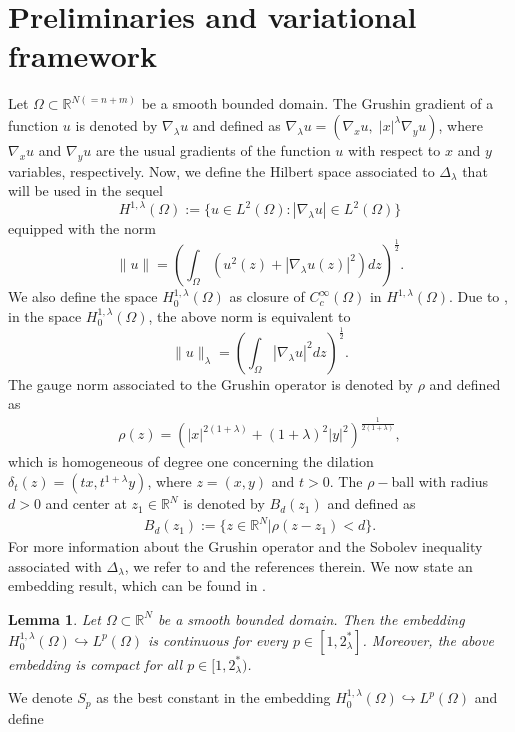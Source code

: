 \documentclass[12pt, notitlepage]{article}
\def\R{\mathbb{R}}
\newtheorem{lem}[theorem]{Lemma}
\begin{document}
{\section{Preliminaries and variational framework}\label{Pri}
Let $\Omega\subset\R^{N(=n+m)}$ be a smooth bounded domain. The Grushin gradient of a function $u$ is denoted by $\nabla_\lambda u$ and defined as $\nabla_\lambda u=(\nabla_x u,\;|x|^\lambda \nabla_y u)$, where $\nabla_x u$ and $\nabla_y u$ are the usual gradients of the function $u$ with respect to $x$ and $y$ variables, respectively. Now, we define the Hilbert space associated to $\Delta_\lambda$ that will be used in the sequel  $$H^{1,\lambda}(\Omega):=\{ u\in L^2(\Omega): |\nabla_\lambda u|\in L^2(\Omega)\}$$
equipped with the norm
$$\|u\|=\left (\int_\Omega \left (u^2(z)+ |\nabla_\lambda u(z)|^2\right ) dz\right )^\frac{1}{2}.$$
 We also define the space $H^{1,\lambda}_0(\Omega)$ as closure of $C_c^\infty(\Omega)$ in $H^{1,\lambda}(\Omega)$. Due to \cite[Theorem 2.1]{MP09}, in the space $H^{1,\lambda}_0(\Omega)$, the above norm is equivalent to $$\|u\|_\lambda=\left (\int_\Omega |\nabla_\lambda u|^2 dz \right )^\frac{1}{2}.$$ 
 The gauge norm associated to the Grushin operator is denoted by $\rho$ and defined as 
 \begin{align}\label{gauge}
     \rho(z)=\left ( |x|^{2(1+\lambda)}+(1+\lambda)^2|y|^2\right )^\frac{1}{2(1+\lambda)},
 \end{align}
 which is homogeneous of degree one concerning the dilation $\delta_t(z)=(tx, t^{1+\lambda}y)$, where $z=(x,y)$ and $t>0$. The $\rho-$ball with radius $d>0$ and center at $z_1\in\R^N$ is denoted by $B_d(z_1)$ and defined as 
 \begin{align}\label{gaugeb}
     B_d(z_1):=\{z\in\R^N| \rho(z-z_1)<d\}.
 \end{align}
For more information about the Grushin operator and the Sobolev inequality associated with $\Delta_\lambda$, we refer to \cite{FL, KOG} and the references therein. We now state an embedding result, which can be found in \cite{KOG}.
\begin{lem}\label{Emb}
    Let $\Omega\subset\R^N$ be a smooth bounded domain. Then the embedding
    $H^{1,\lambda}_0(\Omega)\hookrightarrow L^p(\Omega)$ is continuous for every $p\in [1, 2^*_\lambda]$. Moreover, the above embedding is compact for all $p\in [1, 2^*_\lambda)$.
\end{lem}
We denote $S_p$ as the best constant in the embedding $H^{1,\lambda}_0(\Omega)\hookrightarrow L^p(\Omega)$ and
define \textcolor{black}{
\begin{align*}

\end{align*}}}
\end{document}

